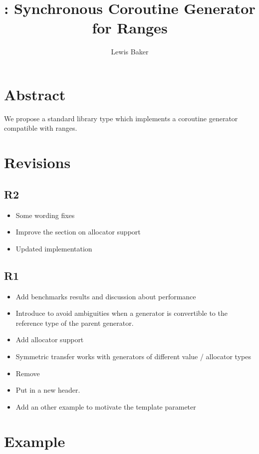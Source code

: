 \documentclass{wg21}
\title{\tcode{std::generator}: Synchronous Coroutine Generator for Ranges}
\author{Lewis Baker}{lewissbaker@gmail.com}
\begin{document}
\maketitle


\section{Abstract}

We propose a standard library type  which implements a coroutine generator compatible with ranges.

\section{Revisions}

\subsection{R2}
\begin{itemize}
\item Some wording fixes
\item Improve the section on allocator support
\item Updated implementation
\end{itemize}

\subsection{R1}
\begin{itemize}
\item Add benchmarks results and discussion about performance
\item Introduce  to avoid ambiguities when a generator is convertible to the reference type of the parent generator.
\item Add allocator support
\item Symmetric transfer works with generators of different value / allocator types
\item Remove 
\item Put  in a new  header.
\item Add an other example to motivate the  template parameter
\end{itemize}


\section{Example}
\end{document}
